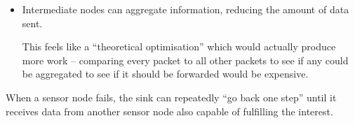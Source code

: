 \documentclass[10pt,\jkfside,a4paper]{article}
\begin{document}
\begin{enumerate}[label=(\alph*)]
\begin{enumerate}[label=(\roman*)]
\begin{itemize}
\item Intermediate nodes can aggregate information, reducing the amount of
data sent.

This feels like a ``theoretical optimisation'' which would actually produce
more work -- comparing every packet to all other packets to see if any could
be aggregated to see if it should be forwarded would be expensive.

\end{itemize}

When a sensor node fails, the sink can repeatedly ``go back one step'' until
it receives data from another sensor node also capable of fulfilling the
interest.

\end{enumerate}

\end{enumerate}
\end{document}
